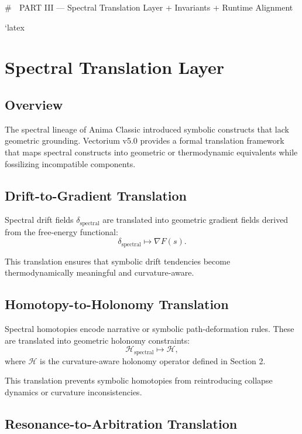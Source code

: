 # 📘 PART III — Spectral Translation Layer + Invariants + Runtime Alignment

`latex
\section{Spectral Translation Layer}

\subsection{Overview}

The spectral lineage of Anima Classic introduced symbolic constructs that lack
geometric grounding. Vectorium v5.0 provides a formal translation framework that
maps spectral constructs into geometric or thermodynamic equivalents while
fossilizing incompatible components.

\subsection{Drift-to-Gradient Translation}

Spectral drift fields $\delta_{\text{spectral}}$ are translated into geometric
gradient fields derived from the free-energy functional:
\[
\delta_{\text{spectral}} \mapsto \nabla F(s).
\]

This translation ensures that symbolic drift tendencies become thermodynamically
meaningful and curvature-aware.

\subsection{Homotopy-to-Holonomy Translation}

Spectral homotopies encode narrative or symbolic path-deformation rules. These
are translated into geometric holonomy constraints:
\[
\mathcal{H}_{\text{spectral}} \mapsto \mathcal{H},
\]
where $\mathcal{H}$ is the curvature-aware holonomy operator defined in Section
2.

This translation prevents symbolic homotopies from reintroducing collapse
dynamics or curvature inconsistencies.

\subsection{Resonance-to-Arbitration Translation}

